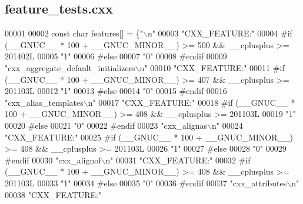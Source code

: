 \subsection{feature\+\_\+tests.\+cxx}
\label{soapysdr_2build_2CMakeFiles_2feature__tests_8cxx_source}

\begin{DoxyCode}
00001 
00002   \textcolor{keyword}{const} \textcolor{keywordtype}{char} features[] = \{\textcolor{stringliteral}{"\(\backslash\)n"}
00003 \textcolor{stringliteral}{"CXX\_FEATURE:"}
00004 \textcolor{preprocessor}{#if (\_\_GNUC\_\_ * 100 + \_\_GNUC\_MINOR\_\_) >= 500 && \_\_cplusplus >= 201402L}
00005 \textcolor{stringliteral}{"1"}
00006 \textcolor{preprocessor}{#else}
00007 \textcolor{stringliteral}{"0"}
00008 \textcolor{preprocessor}{#endif}
00009 \textcolor{stringliteral}{"cxx\_aggregate\_default\_initializers\(\backslash\)n"}
00010 \textcolor{stringliteral}{"CXX\_FEATURE:"}
00011 \textcolor{preprocessor}{#if (\_\_GNUC\_\_ * 100 + \_\_GNUC\_MINOR\_\_) >= 407 && \_\_cplusplus >= 201103L}
00012 \textcolor{stringliteral}{"1"}
00013 \textcolor{preprocessor}{#else}
00014 \textcolor{stringliteral}{"0"}
00015 \textcolor{preprocessor}{#endif}
00016 \textcolor{stringliteral}{"cxx\_alias\_templates\(\backslash\)n"}
00017 \textcolor{stringliteral}{"CXX\_FEATURE:"}
00018 \textcolor{preprocessor}{#if (\_\_GNUC\_\_ * 100 + \_\_GNUC\_MINOR\_\_) >= 408 && \_\_cplusplus >= 201103L}
00019 \textcolor{stringliteral}{"1"}
00020 \textcolor{preprocessor}{#else}
00021 \textcolor{stringliteral}{"0"}
00022 \textcolor{preprocessor}{#endif}
00023 \textcolor{stringliteral}{"cxx\_alignas\(\backslash\)n"}
00024 \textcolor{stringliteral}{"CXX\_FEATURE:"}
00025 \textcolor{preprocessor}{#if (\_\_GNUC\_\_ * 100 + \_\_GNUC\_MINOR\_\_) >= 408 && \_\_cplusplus >= 201103L}
00026 \textcolor{stringliteral}{"1"}
00027 \textcolor{preprocessor}{#else}
00028 \textcolor{stringliteral}{"0"}
00029 \textcolor{preprocessor}{#endif}
00030 \textcolor{stringliteral}{"cxx\_alignof\(\backslash\)n"}
00031 \textcolor{stringliteral}{"CXX\_FEATURE:"}
00032 \textcolor{preprocessor}{#if (\_\_GNUC\_\_ * 100 + \_\_GNUC\_MINOR\_\_) >= 408 && \_\_cplusplus >= 201103L}
00033 \textcolor{stringliteral}{"1"}
00034 \textcolor{preprocessor}{#else}
00035 \textcolor{stringliteral}{"0"}
00036 \textcolor{preprocessor}{#endif}
00037 \textcolor{stringliteral}{"cxx\_attributes\(\backslash\)n"}
00038 \textcolor{stringliteral}{"CXX\_FEATURE:"}

\end{DoxyCode}
